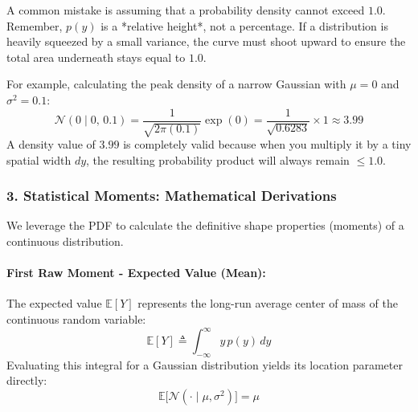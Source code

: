 \documentclass{article}
\begin{document}
\begin{tcolorbox}[colback=red!5!white, colframe=red!60!black, title=Critical Concept: Density is NOT Probability]
A common mistake is assuming that a probability density cannot exceed $1.0$. Remember, $p(y)$ is a *relative height*, not a percentage. If a distribution is heavily squeezed by a small variance, the curve must shoot upward to ensure the total area underneath stays equal to $1.0$. 

For example, calculating the peak density of a narrow Gaussian with $\mu=0$ and $\sigma^2=0.1$:
\begin{equation*}
    \mathcal{N}(0 \mid 0, \, 0.1) = \frac{1}{\sqrt{2\pi(0.1)}} \exp(0) = \frac{1}{\sqrt{0.6283}} \times 1 \approx \mathbf{3.99}
\end{equation*}
A density value of $3.99$ is completely valid because when you multiply it by a tiny spatial width $dy$, the resulting probability product will always remain $\le 1.0$.
\end{tcolorbox}

\subsubsection*{3. Statistical Moments: Mathematical Derivations}
We leverage the PDF to calculate the definitive shape properties (moments) of a continuous distribution.

\paragraph{First Raw Moment - Expected Value (Mean):}
The expected value $\mathbb{E}[Y]$ represents the long-run average center of mass of the continuous random variable:
\begin{equation}
    \mathbb{E}[Y] \triangleq \int_{-\infty}^{\infty} y \, p(y) \, dy
\end{equation}
Evaluating this integral for a Gaussian distribution yields its location parameter directly:
\begin{equation}
    \mathbb{E}\big[\mathcal{N}(\cdot \mid \mu, \sigma^2)\big] = \mu
\end{equation}
\end{document}
